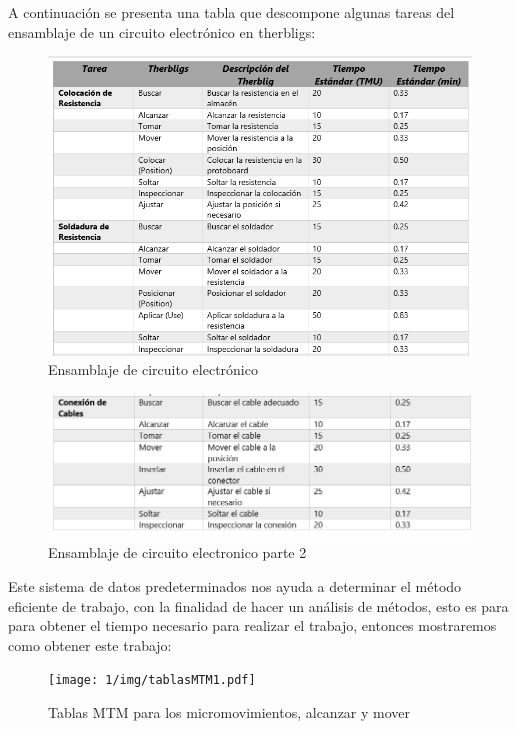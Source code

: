     A continuación se presenta una tabla que descompone algunas tareas del ensamblaje de un circuito electrónico en therbligs:
    \begin{figure}[H]
        \centering
        \includegraphics[scale=0.40]{1/img/Ensamblaje de circuito electronico.png}
        \caption{Ensamblaje de circuito electrónico}
    \end{figure}
    
    
    \begin{figure}[H]
        \centering
        \includegraphics[scale=0.30]{1/img/Ensamblaje de circuito electronico parte 2.png}
        \caption{Ensamblaje de circuito electronico parte 2}
    \end{figure}
    Este sistema de datos predeterminados nos ayuda a determinar el método eficiente de trabajo, con la finalidad de hacer un análisis de métodos, esto es para para obtener el tiempo necesario para realizar el trabajo, entonces mostraremos como obtener este trabajo:
    
     \begin{figure}[H]
            \centering
            \texttt{[image: 1/img/tablasMTM1.pdf]}
            \caption{Tablas MTM para los micromovimientos, alcanzar y mover}
            \label{tablasMTM1}
        \end{figure}
    
